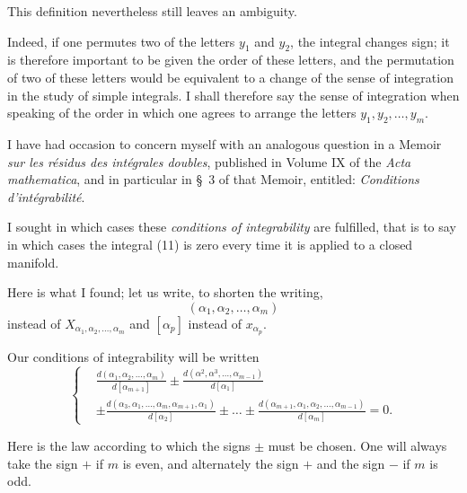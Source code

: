 \documentclass{article}
\begin{document}
This definition nevertheless still leaves an ambiguity.

Indeed, if one permutes two of the letters $y_{1}$ and $y_{2}$, the integral changes sign; it is therefore important to be given the order of these letters, and the permutation of two of these letters would be equivalent to a change of the sense of integration in the study of simple integrals. I shall therefore say the sense of integration when speaking of the order in which one agrees to arrange the letters $y_{1}, y_{2}, \ldots, y_{m}$.

I have had occasion to concern myself with an analogous question in a Memoir \emph{sur les résidus des intégrales doubles}, published in Volume IX of the \emph{Acta mathematica}, and in particular in \S~3 of that Memoir, entitled: \emph{Conditions d'intégrabilité}.

I sought in which cases these \emph{conditions of integrability} are fulfilled, that is to say in which cases the integral (11) is zero every time it is applied to a closed manifold.

Here is what I found; let us write, to shorten the writing,
\[
(\alpha_{1}, \alpha_{2}, \ldots, \alpha_{m})
\]
instead of $X_{\alpha_{1}, \alpha_{2}, \ldots, \alpha_{m}}$ and $[\alpha_{p}]$ instead of $x_{\alpha_{p}}$.

Our conditions of integrability will be written
\[
\left\{
\begin{aligned}
&\frac{d(\alpha_{1}, \alpha_{2}, \ldots, \alpha_{m})}{d[\alpha_{m+1}]} \pm \frac{d(\alpha^{2}, \alpha^{3}, \ldots, \alpha_{m-1})}{d[\alpha_{1}]}\\
&\pm \frac{d(\alpha_{3}, \alpha_{1}, \ldots, \alpha_{m}, \alpha_{m+1}, \alpha_{1})}{d[\alpha_{2}]} \pm \ldots \pm \frac{d(\alpha_{m+1}, \alpha_{1}, \alpha_{2}, \ldots, \alpha_{m-1})}{d[\alpha_{m}]} = 0.
\end{aligned}
\right. \tag{12}
\]

Here is the law according to which the signs $\pm$ must be chosen. One will always take the sign $+$ if $m$ is even, and alternately the sign $+$ and the sign $-$ if $m$ is odd.
\end{document}
